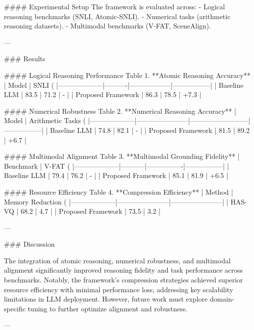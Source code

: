 #### Experimental Setup
The framework is evaluated across:
- Logical reasoning benchmarks (SNLI, Atomic-SNLI).
- Numerical tasks (arithmetic reasoning datasets).
- Multimodal benchmarks (V-FAT, SceneAlign).

---

### Results

#### Logical Reasoning Performance
Table 1. **Atomic Reasoning Accuracy**  
| Model              | SNLI (%
|--------------------|----------|------------------|-----------------|
| Baseline LLM       | 83.5     | 71.2             | -               |
| Proposed Framework | 86.3     | 78.5             | +7.3            |

#### Numerical Robustness
Table 2. **Numerical Reasoning Accuracy**  
| Model              | Arithmetic Tasks (%
|--------------------|-----------------------|--------------------------|-----------------|
| Baseline LLM       | 74.8                 | 82.1                     | -               |
| Proposed Framework | 81.5                 | 89.2                     | +6.7            |

#### Multimodal Alignment
Table 3. **Multimodal Grounding Fidelity**  
| Benchmark          | V-FAT (%
|--------------------|-----------|----------------|-----------------|
| Baseline LLM       | 79.4      | 76.2           | -               |
| Proposed Framework | 85.1      | 81.9           | +6.5            |

#### Resource Efficiency
Table 4. **Compression Efficiency**  
| Method             | Memory Reduction (%
|--------------------|-----------------------|-----------------------|
| HAS-VQ             | 68.2                 | 4.7                   |
| Proposed Framework | 73.5                 | 3.2                   |

---

### Discussion

The integration of atomic reasoning, numerical robustness, and multimodal alignment significantly improved reasoning fidelity and task performance across benchmarks. Notably, the framework's compression strategies achieved superior resource efficiency with minimal performance loss, addressing key scalability limitations in LLM deployment. However, future work must explore domain-specific tuning to further optimize alignment and robustness.

---

